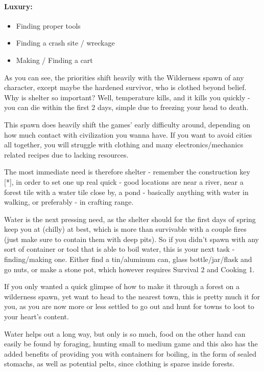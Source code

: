 \paragraph{Luxury:}
\begin{itemize}
\item Finding proper tools
\item Finding a crash site / wreckage
\item Making / Finding a cart
\end{itemize}

As you can see, the priorities shift heavily with the Wilderness spawn of any character, except maybe the hardened survivor, who is clothed beyond belief. Why is shelter so important? Well, temperature kills, and it kills you quickly - you can die within the first 2 days, simple due to freezing your head to death.

This spawn does heavily shift the games' early difficulty around, depending on how much contact with civilization you wanna have. If you want to avoid cities all together, you will struggle with clothing and many electronics/mechanics related recipes due to lacking resources.

The most immediate need is therefore shelter - remember the construction key [*], in order to set one up real quick - good locations are near a river, near a forest tile with a water tile close by, a pond - basically anything with water in walking, or preferably - in crafting range.

Water is the next pressing need, as the shelter should for the first days of spring keep you at (chilly) at best, which is more than survivable with a couple fires (just make sure to contain them with deep pits). So if you didn't spawn with any sort of container or tool that is able to boil water, this is your next task - finding/making one. Either find a tin/aluminum can, glass bottle/jar/flask and go nuts, or make a stone pot, which however requires Survival 2 and Cooking 1.

If you only wanted a quick glimpse of how to make it through a forest on a wilderness spawn, yet want to head to the nearest town, this is pretty much it for you, as you are now more or less settled to go out and hunt for towns to loot to your heart's content.

Water helps out a long way, but only is so much, food on the other hand can easily be found by foraging, hunting small to medium game and this also has the added benefits of providing you with containers for boiling, in the form of sealed stomachs, as well as potential pelts, since clothing is sparse inside forests.

